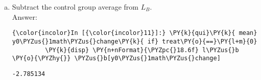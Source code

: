 \documentclass[11pt,notitlepage]{article}\usepackage[]{graphicx}\usepackage[]{color}
\makeatletter
\newenvironment{kframe}{%
 \def\at@end@of@kframe{}%
 \ifinner\ifhmode%
  \def\at@end@of@kframe{\end{minipage}}%
  \begin{minipage}{\columnwidth}%
 \fi\fi%
 \def\FrameCommand##1{\hskip\@totalleftmargin \hskip-\fboxsep
 \colorbox{shadecolor}{##1}\hskip-\fboxsep
     \hskip-\linewidth \hskip-\@totalleftmargin \hskip\columnwidth}%
 \MakeFramed {\advance\hsize-\width
   \@totalleftmargin\z@ \linewidth\hsize
   \@setminipage}}%
 {\par\unskip\endMakeFramed%
 \at@end@of@kframe}
\newenvironment{knitrout}{}{} %
\makeatother
\begin{document}
\begin{enumerate}[a)]
\begin{knitrout}
\begin{kframe}
    \begin{Verbatim}[commandchars=\\\{\}]
{\color{incolor}In [{\color{incolor}9}]:} \PY{k}{disp} \PY{n+nFormat}{\PYZpc{}8.6f} l\PYZus{}b
\end{Verbatim}

    \begin{Verbatim}[commandchars=\\\{\}]
3.701513

    \end{Verbatim}

    \begin{Verbatim}[commandchars=\\\{\}]
{\color{incolor}In [{\color{incolor}10}]:} \PY{k}{disp} \PY{n+nFormat}{\PYZpc{}8.7f} \PY{l+m}{1}\PY{o}{\PYZhy{}}l\PYZus{}b\PYZus{}count\PY{o}{/}\PY{n+nf}{r}(N)
\end{Verbatim}

    \begin{Verbatim}[commandchars=\\\{\}]
0.2450675

    \end{Verbatim}

\end{kframe}
\end{knitrout}

The average value of the observations less than or equal to 40 is 3.70. There are 727 such values, and  1- (727/963) = 24.5\%. The rate of missing for the control group is 24.1\%.  


\item Subtract the control group average from $L_B$.\\
Answer:\\
\begin{knitrout}
\color{fgcolor}\begin{kframe}
    \begin{Verbatim}[commandchars=\\\{\}]
{\color{incolor}In [{\color{incolor}11}]:} \PY{k}{qui}\PY{k}{ mean} y0\PYZus{}1math\PYZus{}change\PY{k}{ if} treat\PY{o}{==}\PY{l+m}{0} 
         \PY{k}{disp} \PY{n+nFormat}{\PYZpc{}18.6f} l\PYZus{}b \PY{o}{\PYZhy{}} \PYZus{}b[y0\PYZus{}1math\PYZus{}change]
\end{Verbatim}
    \begin{Verbatim}[commandchars=\\\{\}]
         -2.785134
    \end{Verbatim}
\end{kframe}
\end{knitrout}



\end{enumerate}
\end{document}
